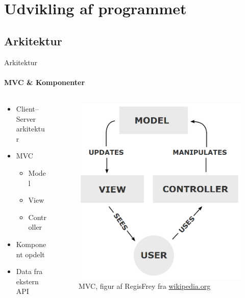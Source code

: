 \section{Udvikling af programmet}
	\subsection{Arkitektur}
		\begin{frame}[t]{Arkitektur}\framesubtitle{MVC \& Komponenter}
			\begin{columns}[T]
				\begin{column}{.48\textwidth}
					\begin{itemize}
						\item Client--Server arkitektur
						\item MVC
						\begin{itemize}
							\item Model
							\item View
							\item Controller
						\end{itemize}
						\item Komponent opdelt
						\item Data fra ekstern API
					\end{itemize}

				\end{column}
				\begin{column}{.48\textwidth}
					\begin{figure}
						\includegraphics[width=1\textwidth]{images/MVC_2.png}
						\caption{MVC, figur af RegisFrey fra \url{wikipedia.org}}
					\end{figure}
				\end{column}
			\end{columns}
		\end{frame}
		
